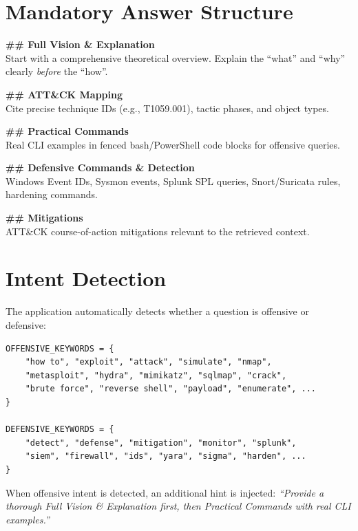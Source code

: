 \documentclass[12pt,a4paper]{report}
\begin{document}
\section{Mandatory Answer Structure}

\begin{tcolorbox}[colback=codegray, colframe=codeblue, title=Mandatory Answer Structure -- Enforced by System Prompt]
\textbf{\#\# Full Vision \& Explanation}\\
Start with a comprehensive theoretical overview. Explain the ``what'' and ``why'' clearly \emph{before} the ``how''.

\medskip
\textbf{\#\# ATT\&CK Mapping}\\
Cite precise technique IDs (e.g., T1059.001), tactic phases, and object types.

\medskip
\textbf{\#\# Practical Commands}\\
Real CLI examples in fenced bash/PowerShell code blocks for offensive queries.

\medskip
\textbf{\#\# Defensive Commands \& Detection}\\
Windows Event IDs, Sysmon events, Splunk SPL queries, Snort/Suricata rules, hardening commands.

\medskip
\textbf{\#\# Mitigations}\\
ATT\&CK course-of-action mitigations relevant to the retrieved context.
\end{tcolorbox}

\section{Intent Detection}

The application automatically detects whether a question is offensive or defensive:

\begin{lstlisting}[style=pythonstyle]
OFFENSIVE_KEYWORDS = {
    "how to", "exploit", "attack", "simulate", "nmap",
    "metasploit", "hydra", "mimikatz", "sqlmap", "crack",
    "brute force", "reverse shell", "payload", "enumerate", ...
}

DEFENSIVE_KEYWORDS = {
    "detect", "defense", "mitigation", "monitor", "splunk",
    "siem", "firewall", "ids", "yara", "sigma", "harden", ...
}
\end{lstlisting}

When offensive intent is detected, an additional hint is injected: \textit{``Provide a thorough Full Vision \& Explanation first, then Practical Commands with real CLI examples.''}
\end{document}
